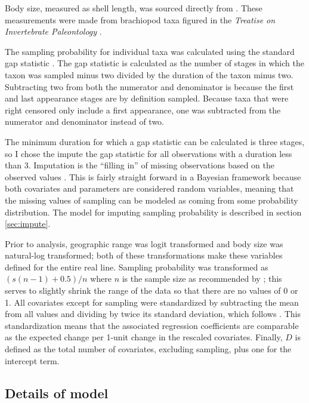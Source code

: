 \documentclass{article}
\begin{document}
Body size, measured as shell length, was sourced directly from \citet{Payne2014}. These measurements were made from brachiopod taxa figured in the \textit{Treatise on Invertebrate Paleontology} \citep{Brunton2007}.

The sampling probability for individual taxa was calculated using the standard gap statistic \citep{Foote1996e,Foote2000}. The gap statistic is calculated as the number of stages in which the taxon was sampled minus two divided by the duration of the taxon minus two. Subtracting two from both the numerator and denominator is because the first and last appearance stages are by definition sampled. Because taxa that were right censored only include a first appearance, one was subtracted from the numerator and denominator instead of two.

The minimum duration for which a gap statistic can be calculated is three stages, so I chose the impute the gap statistic for all observations with a duration less than 3. Imputation is the ``filling in'' of missing observations based on the observed values \citep{Gelman2007}. This is fairly straight forward in a Bayesian framework because both covariates and parameters are considered random variables, meaning that the missing values of sampling can be modeled as coming from some probability distribution. The model for imputing sampling probability is described in section \ref{sec:impute}.

Prior to analysis, geographic range was logit transformed and body size was natural-log transformed; both of these transformations make these variables defined for the entire real line. Sampling probability was transformed as \((s (n - 1) + 0.5) / n\) where \(n\) is the sample size as recommended by \citet{Smithson2006}; this serves to slightly shrink the range of the data so that there are no values of 0 or 1. All covariates except for sampling were standardized by subtracting the mean from all values and dividing by twice its standard deviation, which follows \citet{Gelman2007}. This standardization means that the associated regression coefficients are comparable as the expected change per 1-unit change in the rescaled covariates. Finally, \(D\) is defined as the total number of covariates, excluding sampling, plus one for the intercept term.



\subsection{Details of model}
\label{sec:model}
\end{document}
